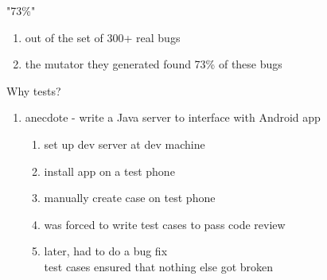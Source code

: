 \documentclass[10pt,usletter]{article}
\newcommand{\tab}[1][1cm]{\hspace*{#1}}
\begin{document}
"73\%"
\begin{enumerate}
\item out of the set of 300+ real bugs
\item the mutator they generated found 73\% of these bugs
\end{enumerate}

Why tests?
\begin{enumerate}
\item anecdote - write a Java server to interface with Android app
\begin{enumerate}
\item set up dev server at dev machine
\item install app on a test phone
\item manually create case on test phone
\item was forced to write test cases to pass code review
\item later, had to do a bug fix\\
\tab test cases ensured that nothing else got broken
\end{enumerate}
\end{enumerate}
\end{document}
